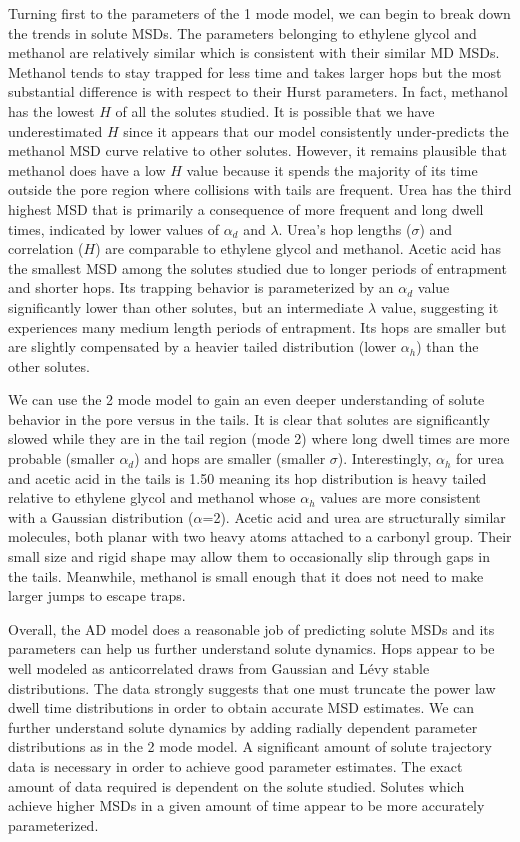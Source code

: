 \documentclass{article}
\begin{document}
  Turning first to the parameters of the 1 mode model, we can begin to break down the
  trends in solute MSDs. The parameters belonging to ethylene glycol and methanol are
  relatively similar which is consistent with their similar MD MSDs. Methanol 
  tends to stay trapped for less time and takes larger hops but the most substantial
  difference is with respect to their Hurst parameters. In fact, methanol has the lowest
  $H$ of all the solutes studied. It is possible that we have underestimated $H$ since 
  it appears that our model consistently under-predicts the methanol MSD curve relative
  to other solutes. However, it remains plausible that methanol does have a low $H$ 
  value because it spends the majority of its time outside the pore region where collisions
  with tails are frequent. Urea has the third highest MSD that is primarily a consequence of
  more frequent and long dwell times, indicated by lower values of $\alpha_d$ and 
  $\lambda$. Urea's hop lengths ($\sigma$) and correlation ($H$) are comparable to ethylene
  glycol and methanol. Acetic acid has the smallest MSD among the solutes studied due 
  to longer periods of entrapment and shorter hops. Its trapping behavior is parameterized
  by an $\alpha_d$ value significantly lower than other solutes, but an intermediate 
  $\lambda$ value, suggesting it experiences many medium length periods of entrapment. 
  Its hops are smaller but are slightly compensated by a heavier tailed distribution 
  (lower $\alpha_h$) than the other solutes. 
  
  We can use the 2 mode model to gain an even deeper understanding of solute behavior
  in the pore versus in the tails. It is clear that solutes are significantly slowed 
  while they are in the tail region (mode 2) where long dwell times are more probable
  (smaller $\alpha_d$) and hops are smaller (smaller $\sigma$). Interestingly, 
  $\alpha_h$ for urea and acetic acid in the tails is 1.50 meaning its hop distribution
  is heavy tailed relative to ethylene glycol and methanol whose $\alpha_h$ values are
  more consistent with a Gaussian distribution ($\alpha$=2). Acetic acid and urea are
  structurally similar molecules, both planar with two heavy atoms attached to a 
  carbonyl group. Their small size and rigid shape may allow them to occasionally slip
  through gaps in the tails. Meanwhile, methanol is small enough that it does not need
  to make larger jumps to escape traps. 
  
  Overall, the AD model does a reasonable job of predicting solute MSDs and its 
  parameters can help us further understand solute dynamics. Hops appear to be well
  modeled as anticorrelated draws from Gaussian and L\'evy stable distributions. 
  The data strongly suggests that one must truncate the power law dwell time 
  distributions in order to obtain accurate MSD estimates. We can further understand
  solute dynamics by adding radially dependent parameter distributions as in the 
  2 mode model. A significant amount of solute trajectory data is necessary 
  in order to achieve good parameter estimates. The exact amount of data required 
  is dependent on the solute studied. Solutes which achieve higher MSDs
  in a given amount of time appear to be more accurately parameterized.
  
\end{document}

